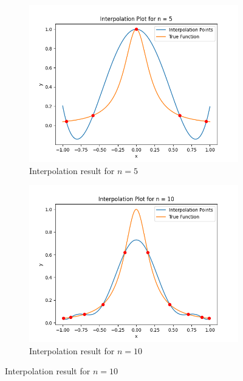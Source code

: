 \documentclass[a4paper]{article}
\begin{document}
\begin{figure}[htbp]
    \centering
    \begin{subfigure}[b]{0.48\textwidth}
        \includegraphics[width = \textwidth]{../results/Task_C/Interpolation_Plot_n_5.png}
        \caption{Interpolation result for $n = 5$}
    \end{subfigure}
    \hfill
    \begin{subfigure}[b]{0.48\textwidth}
        \includegraphics[width = \textwidth]{../results/Task_C/Interpolation_Plot_n_10.png}
        \caption{Interpolation result for $n = 10$}
    \end{subfigure}


\end{figure}
\end{document}
